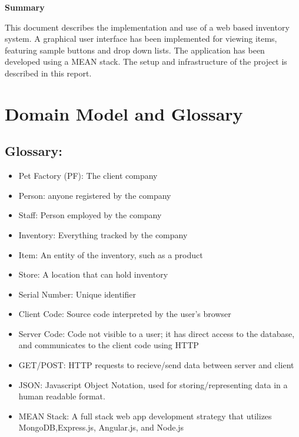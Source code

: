 \documentclass[letterpaper, 12pt]{article}
\title{\vspace{-8ex}}
\author{\vspace{-8ex}}
\date{\vspace{-7ex}}
\begin{document}
\fontsize{12}{12}
\maketitle
\thispagestyle{fancy}

%
%
\noindent \large\textbf{Summary}

\noindent This document describes the implementation and use of a web based inventory system. A graphical user interface has been implemented for viewing items, featuring sample buttons and drop down lists. The application has been developed using a MEAN stack. The setup and infrastructure of the project is described in this report.


\tableofcontents

\newpage
%
%
%
%
%
%
%
%
\section{Domain Model and Glossary}

\subsection{Glossary:}
%
%
\begin{itemize}
\item Pet Factory (PF): The client company
\item Person: anyone registered by the company
\item Staff: Person employed by the company
\item Inventory: Everything tracked by the company
\item Item: An entity of the inventory, such as a product
\item Store: A location that can hold inventory
\item Serial Number: Unique identifier
\item Client Code: Source code interpreted by the user's browser
\item Server Code: Code not visible to a user; it has direct access to the database, and communicates to the client code using HTTP
\item GET/POST: HTTP requests to recieve/send data between server and client
\item JSON: Javascript Object Notation, used for storing/representing data in a human readable format.
\item MEAN Stack: A full stack web app development strategy that utilizes MongoDB,Express.js, Angular.js, and Node.js

\end{itemize}
\end{document}
